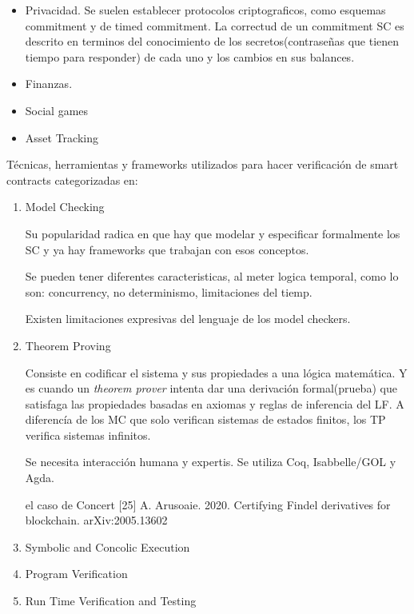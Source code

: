 \begin{itemize}
\begin{itemize}
\item Privacidad. Se suelen establecer
protocolos criptograficos, como esquemas commitment y
de timed commitment. La correctud de
un commitment SC es descrito en terminos
del conocimiento de los secretos(contraseñas
que tienen tiempo para responder) de cada uno
y los cambios en sus balances. 
\item Finanzas. 
\item Social games
\item Asset Tracking 
\end{itemize}
\end{itemize}


Técnicas, herramientas y frameworks utilizados
para hacer verificación de smart contracts categorizadas en:

\begin{enumerate}
\item Model Checking

Su popularidad radica en que hay que
modelar y especificar formalmente los SC
y ya hay frameworks que trabajan con esos conceptos.

Se pueden tener diferentes caracteristicas, al meter logica temporal, como lo son:
concurrency, no determinismo, limitaciones del tiemp.

Existen limitaciones expresivas del lenguaje de los model checkers.
\item Theorem Proving

Consiste en codificar el sistema y sus propiedades a una
lógica matemática. Y es cuando un {\it theorem prover}
intenta dar una derivación formal(prueba) que satisfaga las propiedades
basadas en axiomas y reglas de inferencia del LF. A diferencía de los
MC que solo verifican sistemas de estados finitos, los TP verifica
sistemas infinitos.

Se necesita interacción humana y expertis. Se utiliza Coq, Isabbelle/GOL y Agda.

el caso de Concert
[25] A. Arusoaie. 2020. Certifying Findel derivatives for blockchain. arXiv:2005.13602

\item Symbolic and Concolic Execution   
\item Program Verification
\item Run Time Verification and Testing

\end{enumerate}

